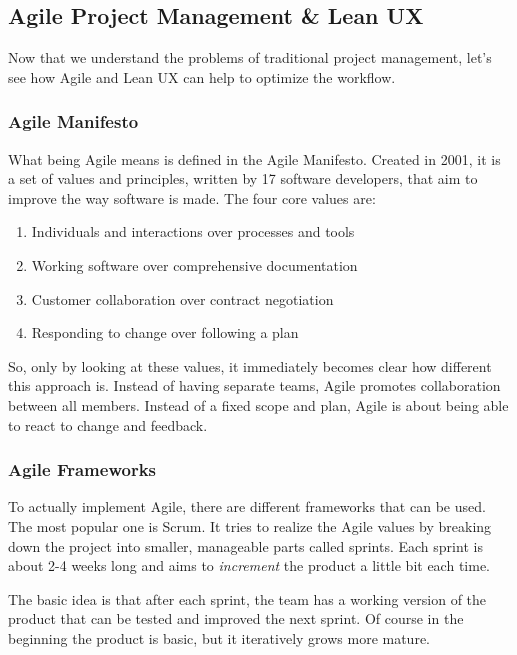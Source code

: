 \subsection{Agile Project Management \& Lean UX}
Now that we understand the problems of traditional project management, let's see how Agile and Lean
UX can help to optimize the workflow.

\subsubsection{Agile Manifesto}

What being Agile means is defined in the Agile Manifesto. Created in 2001, it is a set of values and
principles, written by 17 software developers, that aim to improve the way software is made. The
four core values are:
\begin{enumerate}
    \item Individuals and interactions over processes and tools
    \item Working software over comprehensive documentation
    \item Customer collaboration over contract negotiation
    \item Responding to change over following a plan
\end{enumerate}

So, only by looking at these values, it immediately becomes clear how different this approach is.
Instead of having separate teams, Agile promotes collaboration between all members. Instead of a 
fixed scope and plan, Agile is about being able to react to change and feedback. 

\subsubsection{Agile Frameworks}
To actually implement Agile, there are different frameworks that can be used. The most popular one
is Scrum. It tries to realize the Agile values by breaking down the project into smaller, manageable
parts called sprints. Each sprint is about 2-4 weeks long and aims to \textit{increment} the product
a little bit each time. 

The basic idea is that after each sprint, the team has a working version of the product that can be
tested and improved the next sprint. Of course in the beginning the product is basic, but it
iteratively grows more mature. 

